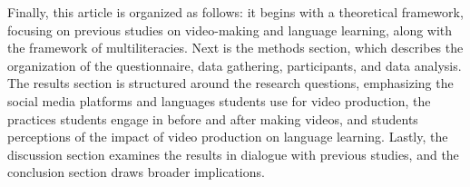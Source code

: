 Finally, this article is organized as follows: it begins with a
theoretical framework, focusing on previous studies on video-making and
language learning, along with the framework of multiliteracies. Next is
the methods section, which describes the organization of the
questionnaire, data gathering, participants, and data analysis. The
results section is structured around the research questions, emphasizing
the social media platforms and languages students use for video
production, the practices students engage in before and after making
videos, and students\textquotesingle{} perceptions of the impact of
video production on language learning. Lastly, the discussion section
examines the results in dialogue with previous studies, and the
conclusion section draws broader implications.